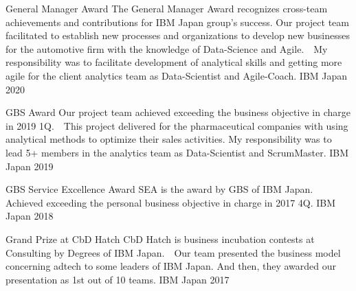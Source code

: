 



\begin{cvhonors}

  \cvhonor
    {General Manager Award} %
    {The General Manager Award recognizes cross-team achievements and contributions for IBM Japan group's success. Our project team facilitated to establish new processes and organizations to develop new businesses for the automotive firm with the knowledge of Data-Science and Agile.　My responsibility was to facilitate development of analytical skills and getting more agile for the client analytics team as Data-Scientist and Agile-Coach.} %
    {IBM Japan} %
    {2020} %

  \cvhonor
    {GBS Award} %
    {Our project team achieved exceeding the business objective in charge in 2019 1Q.　This project delivered for the pharmaceutical companies with using analytical methods to optimize their sales activities. My responsibility was to lead 5+ members in the analytics team as Data-Scientist and ScrumMaster.} %
    {IBM Japan} %
    {2019} %

  \cvhonor
    {GBS Service Excellence Award} %
    {SEA is the award by GBS of IBM Japan.　Achieved exceeding the personal business objective in charge in 2017 4Q.} %
    {IBM Japan} %
    {2018} %

  \cvhonor
    {Grand Prize at CbD Hatch} %
    {CbD Hatch is business incubation contests at Consulting by Degrees of IBM Japan.　Our team presented the business model concerning adtech to some leaders of IBM Japan. And then, they awarded our presentation as 1st out of 10 teams.} %
    {IBM Japan} %
    {2017} %


\end{cvhonors}


